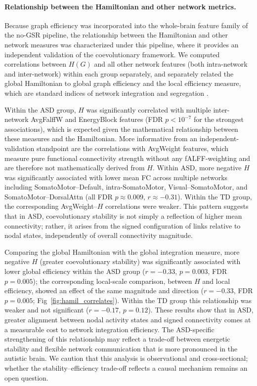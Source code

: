 \documentclass[10pt,letterpaper]{article}
\begin{document}
\paragraph*{Relationship between the Hamiltonian and other network metrics.}
Because graph efficiency was incorporated into the whole-brain feature family of the no-GSR pipeline,
the relationship between the Hamiltonian and other network measures was characterized under this
pipeline, where it provides an independent validation of the coevolutionary framework. We computed
correlations between $H(G)$ and all other network features (both intra-network and inter-network)
within each group separately, and separately related the global Hamiltonian to global graph
efficiency and the local efficiency measure, which are standard indices of network integration and
segregation \cite{Latora2001,Fornito2016}.

Within the ASD group, $H$ was significantly correlated with multiple inter-network AvgFalffW and
EnergyBlock features (FDR $p < 10^{-7}$ for the strongest associations), which is expected given
the mathematical relationship between these measures and the Hamiltonian. More informative from an
independent-validation standpoint are the correlations with AvgWeight features, which measure pure
functional connectivity strength without any fALFF-weighting and are therefore not mathematically
derived from $H$. Within ASD, more negative $H$ was significantly associated with lower mean FC
across multiple networks including SomatoMotor--Default, intra-SomatoMotor, Visual--SomatoMotor, and
SomatoMotor--DorsalAttn (all FDR $p \approx 0.009$, $r \approx -0.31$). Within
the TD group, the corresponding AvgWeight--$H$ correlations were weaker. This pattern
suggests that in ASD, coevolutionary stability is not simply a reflection of higher mean connectivity;
rather, it arises from the signed configuration of links relative to nodal states, independently of
overall connectivity magnitude.

Comparing the global Hamiltonian with the global integration measure, more negative $H$ (greater
coevolutionary stability) was significantly associated with lower global efficiency within the ASD
group ($r = -0.33$, $p = 0.003$, FDR $p = 0.005$); the corresponding local-scale comparison, between
$H$ and local efficiency, showed an effect of the same magnitude and direction ($r = -0.33$,
FDR $p = 0.005$; Fig~\ref{fig:hamil_correlates}). Within the TD group this relationship was
weaker and not significant ($r = -0.17$, $p = 0.12$). These results show
that in ASD, greater alignment between nodal activity states and signed connectivity comes at a
measurable cost to network integration efficiency. The ASD-specific strengthening of this
relationship may reflect a trade-off between energetic stability and flexible network communication
that is more pronounced in the autistic brain. We caution that this analysis is observational and
cross-sectional; whether the stability--efficiency trade-off reflects a causal mechanism remains an
open question.
\end{document}
